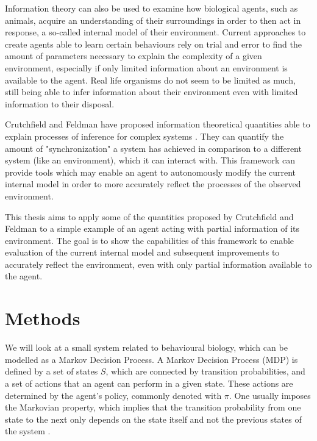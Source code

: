 \documentclass[12pt,a4paper]{article}
\begin{document}
Information theory can also be used to examine how biological agents, such as animals, acquire an understanding of their surroundings in order to then act in response, a so-called internal model of their environment.
Current approaches to create agents able to learn certain behaviours rely on trial and error to find the amount of parameters necessary to explain the complexity of a given environment, especially if only limited information about an environment is available to the agent.
Real life organisms do not seem to be limited as much, still being able to infer information about their environment even with limited information to their disposal.

Crutchfield and Feldman have proposed information theoretical quantities able to explain processes of inference for complex systems \autocite{crutchfield2003regularities}.
They can quantify the amount of "synchronization" a system has achieved in comparison to a different system (like an environment), which it can interact with.
This framework can provide tools which may enable an agent to autonomously modify the current internal model in order to more accurately reflect the processes of the observed environment.

This thesis aims to apply some of the quantities proposed by Crutchfield and Feldman to a simple example of an agent acting with partial information of its environment.
The goal is to show the capabilities of this framework to enable evaluation of the current internal model and subsequent improvements to accurately reflect the environment, even with only partial information available to the agent.


\newpage
\section{Methods} \label{sec:methods}

We will look at a small system related to behavioural biology, which can be modelled as a Markov Decision Process.
A Markov Decision Process (MDP) \autocite{bellman1957MDP} is defined by a set of states $S$, which are connected by transition probabilities, and a set of actions that an agent can perform in a given state.
These actions are determined by the agent's policy, commonly denoted with $\pi$.
One usually imposes the Markovian property, which implies that the transition probability from one state to the next only depends on the state itself and not the previous states of the system \autocite{cover1999elements}.
\end{document}
